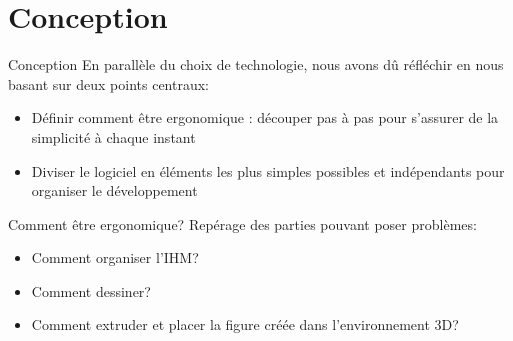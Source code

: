 \documentclass[a4paper,10pt]{beamer}
\begin{document}
	\section{Conception}	
		\begin{frame}{Conception}
	 		En parallèle du choix de technologie, nous avons dû réfléchir en nous basant sur deux points centraux:
		
			\begin{itemize}
				  \item Définir comment être ergonomique : découper pas à pas pour s'assurer de la simplicité à chaque instant
				  \item Diviser le logiciel en éléments les plus simples possibles et indépendants pour organiser le développement
			\end{itemize}
		\end{frame}
		
		
		\begin{frame}{Comment être ergonomique?}
				Repérage des parties pouvant poser problèmes:
				
				\begin{itemize}
					\item Comment organiser l'IHM?
					\item Comment dessiner?
					\item Comment extruder et placer la figure créée dans l'environnement 3D?
				\end{itemize}
		\end{frame}	
		
\end{document}
